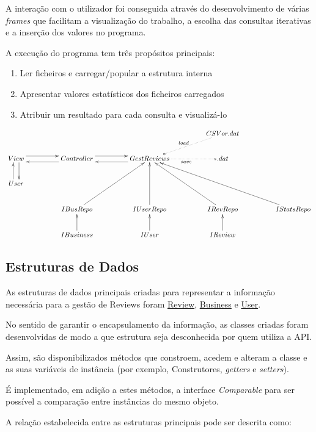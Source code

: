\documentclass[11pt]{article}
\begin{document}
A interação com o utilizador foi conseguida através do desenvolvimento de várias \textit{frames} que facilitam a visualização do trabalho, a escolha das consultas iterativas e a inserção dos valores no programa. 

A execução do programa tem três propósitos principais:

\begin{enumerate}
	\item Ler ficheiros e carregar/popular a estrutura interna
	\item Apresentar valores estatísticos dos ficheiros carregados
	\item Atribuir um resultado para cada consulta e visualizá-lo
\end{enumerate}

\begin{equation*}
	\xymatrixcolsep{4pc}\xymatrix {
		& & & CSV or .dat\ar@{.o}[dl]_{load} \\
	View\ar@<1ex>[r]\ar@<1ex>[d] & Controller\ar@<1ex>[r]\ar@<1ex>[l] & GestReviews\ar@<1ex>[l]\ar@{.o}[r]_{save} & .dat \\
	User\ar@<1ex>[u] \\
	& IBusRepo\ar[uur] & IUserRepo\ar[uu] & IRevRepo\ar[uul] & IStatsRepo\ar[uull] \\
	& IBusiness\ar[u] & IUser\ar[u] & IReview\ar[u]
	}
\end{equation*}

\subsection{Estruturas de Dados}

As estruturas de dados principais criadas para representar a informação necessária para a gestão de Reviews foram \underline{Review}, \underline{Business} e \underline{User}.

No sentido de garantir o encapsulamento da informação, as classes criadas foram desenvolvidas de modo a que estrutura seja desconhecida por quem utiliza a API.

Assim, são disponibilizados métodos que constroem, acedem e alteram a classe e as suas variáveis de instância (por exemplo, Construtores, \textit{getters} e \textit{setters}).

É implementado, em adição a estes métodos, a interface \textit{Comparable} para ser possível a comparação entre instâncias do mesmo objeto.

A relação estabelecida entre as estruturas principais pode ser descrita como:
\end{document}
